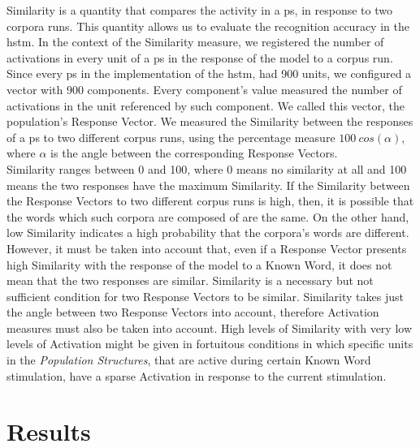 \documentclass[11pt,a4paper]{article}
\begin{document}
Similarity is a quantity that compares the activity in a
\ac{ps}, in response to two corpora runs.
This quantity allows us to evaluate the recognition accuracy in the \ac{hstm}.
In the context of the Similarity measure, we registered the number of activations in every
unit of a \ac{ps} in the response of the model to a corpus run.
Since every \ac{ps} in the implementation of the \ac{hstm}, had 900 units, we configured a
vector with 900 components.
Every component's value measured the number of activations in the unit referenced
by such component.
We called this vector, the population's Response Vector.
We measured the Similarity between the responses of a \ac{ps} to two different corpus runs,
using the percentage measure $100 ~ cos(\alpha)$, where $\alpha$ is the angle between the
corresponding Response Vectors.\\

Similarity ranges between 0 and 100, where 0 means no similarity at all and 100 means
the two responses have the maximum Similarity.
If the Similarity between the Response Vectors to two different corpus runs is high,
then, it is possible that the words which such corpora are composed of are the same.
On the other hand, low Similarity indicates a high probability that the corpora's
words are different.
However, it must be taken into account that, even if a Response Vector presents high Similarity
with the response of the model to a Known Word, it does not mean that the two responses
are similar.
Similarity is a necessary but not sufficient condition for two Response Vectors to be
similar.
Similarity takes just the angle between two Response Vectors into account, therefore
Activation measures must also be taken into account.
High levels of Similarity with very low levels of Activation might be given
in fortuitous conditions in which specific units in the \textit{Population Structures},
that are active during certain Known Word stimulation, have a sparse Activation
in response to the current stimulation.\\

















\section{Results} \label{Res}
\end{document}
